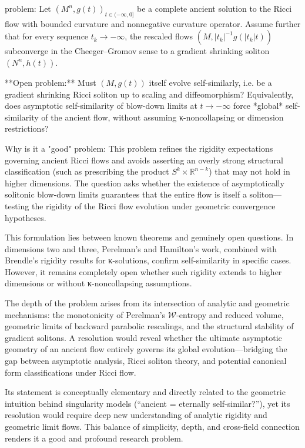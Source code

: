 problem:  
Let \((M^n, g(t))_{t\in(-\infty,0]}\) be a complete ancient solution to the Ricci flow with bounded curvature and nonnegative curvature operator. Assume further that for every sequence \(t_k \to -\infty\), the rescaled flows \((M, |t_k|^{-1} g(|t_k|t))\) subconverge in the Cheeger–Gromov sense to a gradient shrinking soliton \((N^n, h(t))\).  

**Open problem:**  
Must \((M, g(t))\) itself evolve self-similarly, i.e. be a gradient shrinking Ricci soliton up to scaling and diffeomorphism?  
Equivalently, does asymptotic self-similarity of blow-down limits at \(t\to -\infty\) force *global* self-similarity of the ancient flow, without assuming κ-noncollapsing or dimension restrictions?  

Why is it a "good" problem:  
This problem refines the rigidity expectations governing ancient Ricci flows and avoids asserting an overly strong structural classification (such as prescribing the product \(S^k\times\mathbb{R}^{n-k}\)) that may not hold in higher dimensions. The question asks whether the existence of asymptotically solitonic blow-down limits guarantees that the entire flow is itself a soliton—testing the rigidity of the Ricci flow evolution under geometric convergence hypotheses.  

This formulation lies between known theorems and genuinely open questions. In dimensions two and three, Perelman’s and Hamilton’s work, combined with Brendle’s rigidity results for κ-solutions, confirm self-similarity in specific cases. However, it remains completely open whether such rigidity extends to higher dimensions or without κ-noncollapsing assumptions.  

The depth of the problem arises from its intersection of analytic and geometric mechanisms: the monotonicity of Perelman’s \(\mathcal{W}\)-entropy and reduced volume, geometric limits of backward parabolic rescalings, and the structural stability of gradient solitons. A resolution would reveal whether the ultimate asymptotic geometry of an ancient flow entirely governs its global evolution—bridging the gap between asymptotic analysis, Ricci soliton theory, and potential canonical form classifications under Ricci flow.  

Its statement is conceptually elementary and directly related to the geometric intuition behind singularity models (“ancient = eternally self-similar?”), yet its resolution would require deep new understanding of analytic rigidity and geometric limit flows. This balance of simplicity, depth, and cross-field connection renders it a good and profound research problem.